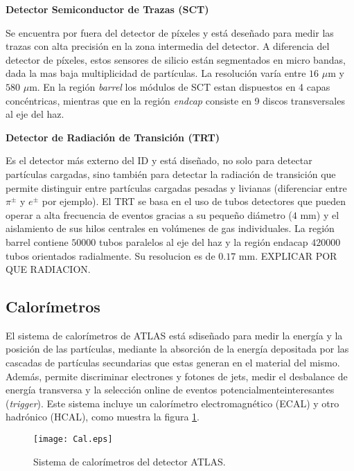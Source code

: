 \vspace{0.5cm}

{\bf Detector Semiconductor de Trazas (SCT) }

Se encuentra por fuera del detector de píxeles y está deseñado para medir las trazas con alta precisión en la zona intermedia del detector. A diferencia del detector de píxeles, estos sensores de silicio están segmentados en micro bandas, dada la mas baja multiplicidad de partículas. La resolución varía entre $16$ $\mu$m y $580$ $\mu$m. En la región \textit{barrel} los módulos de SCT estan dispuestos en 4 capas concéntricas, mientras que en la región \textit{endcap} consiste en 9 discos transversales al eje del haz.

\vspace{0.5cm}

{\bf Detector de Radiación de Transición (TRT) }

Es el detector más externo del ID y está diseñado, no solo para detectar partículas cargadas, sino también para detectar la radiación de transición que permite distinguir entre partículas cargadas pesadas y livianas (diferenciar entre $\pi^{\pm}$ y $e^{\pm}$ por ejemplo). El TRT se basa en el uso de tubos detectores que pueden operar a alta frecuencia de eventos gracias a su pequeño diámetro ($4$ mm) y el aislamiento de sus hilos centrales en volúmenes de gas individuales. La región barrel contiene $50000$ tubos paralelos al eje del haz y la región endacap $420000$ tubos orientados radialmente. Su resolucion es de $0.17$ mm. EXPLICAR POR QUE RADIACION.

\subsection{Calorímetros}

El sistema de calorímetros de ATLAS está sdiseñado para medir la energía y la posición de las partículas, mediante la absorción de la energía depositada por las cascadas de partículas secundarias que estas generan en el material del mismo. Además, permite discriminar electrones y fotones de jets, medir el desbalance de energía transversa y la selección online de eventos potencialmenteinteresantes (\textit{trigger}). Este sistema incluye un calorímetro electromagnético (ECAL) y otro hadrónico (HCAL), como muestra la figura \ref{Cal}.

\begin{figure}
\centering
\texttt{[image: Cal.eps]}
\caption{Sistema de calorímetros del detector ATLAS.}
\label{Cal}
\end{figure}

